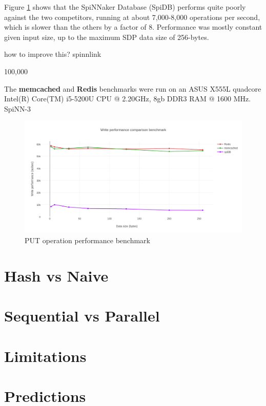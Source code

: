 Figure \ref{fig:write-perf-benchmark} shows that the SpiNNaker Database (SpiDB) performs quite poorly against the two competitors, running at about 7,000-8,000 operations per second, which is slower than the others by a factor of 8. Performance was mostly constant given input size, up to the maximum SDP data size of 256-bytes.

how to improve this? spinnlink


100,000

The \textbf{memcached} and \textbf{Redis} benchmarks were run on an ASUS X555L quadcore Intel(R) Core(TM) i5-5200U CPU @ 2.20GHz, 8gb DDR3 RAM @ 1600 MHz. SpiNN-3

\begin{figure}
\begin{center}
	\includegraphics[width=1.4\textwidth, natwidth=1063, natheight=509]{images/write_performance.png}
\end{center}
\caption{PUT operation performance benchmark}
\label{fig:write-perf-benchmark}
\end{figure}

\section{Hash vs Naive}

\section{Sequential vs Parallel}

\section{Limitations}

\section{Predictions}


